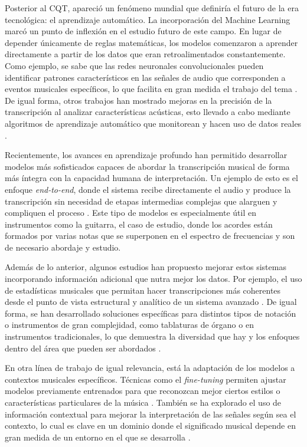Posterior al CQT, apareció un fenómeno mundial que definiría el futuro de la era tecnológica: el aprendizaje automático. La incorporación del Machine Learning marcó un punto de inflexión en el estudio futuro de este campo. En lugar de depender únicamente de reglas matemáticas, los modelos comenzaron a aprender directamente a partir de los datos que eran retroalimentados constantemente. Como ejemplo, se sabe que las redes neuronales convolucionales pueden identificar patrones característicos en las señales de audio que corresponden a eventos musicales específicos, lo que facilita en gran medida el trabajo del tema \cite{cnn_amt2025}. De igual forma, otros trabajos han mostrado mejoras en la precisión de la transcripción al analizar características acústicas, esto llevado a cabo mediante algoritmos de aprendizaje automático que monitorean y hacen uso de datos reales \cite{jaciii2025}.

Recientemente, los avances en aprendizaje profundo han permitido desarrollar modelos más sofisticados capaces de abordar la transcripción musical de forma más íntegra con la capacidad humana de interpretación. Un ejemplo de esto es el enfoque \textit{end-to-end}, donde el sistema recibe directamente el audio y produce la transcripción sin necesidad de etapas intermedias complejas que alarguen y compliquen el proceso \cite{hawthorne2019polyphonic}. Este tipo de modelos es especialmente útil en instrumentos como la guitarra, el caso de estudio, donde los acordes están formados por varias notas que se superponen en el espectro de frecuencias y son de necesario abordaje y estudio.

Además de lo anterior, algunos estudios han propuesto mejorar estos sistemas incorporando información adicional que nutra mejor los datos. Por ejemplo, el uso de estadísticas musicales que permitan hacer transcripciones más coherentes desde el punto de vista estructural y analítico de un sistema avanzado \cite{nonlocal2021}. De igual forma, se han desarrollado soluciones específicas para distintos tipos de notación o instrumentos de gran complejidad, como tablaturas de órgano o en instrumentos tradicionales, lo que demuestra la diversidad que hay y los enfoques dentro del área que pueden ser abordados \cite{organ2022, qanun2024}.

En otra línea de trabajo de igual relevancia, está la adaptación de los modelos a contextos musicales específicos. Técnicas como el \textit{fine-tuning} permiten ajustar modelos previamente entrenados para que reconozcan mejor ciertos estilos o características particulares de la música \cite{musicnet2022finetuning}. También se ha explorado el uso de información contextual para mejorar la interpretación de las señales según sea el contexto, lo cual es clave en un dominio donde el significado musical depende en gran medida de un entorno en el que se desarrolla \cite{ins2021}.


